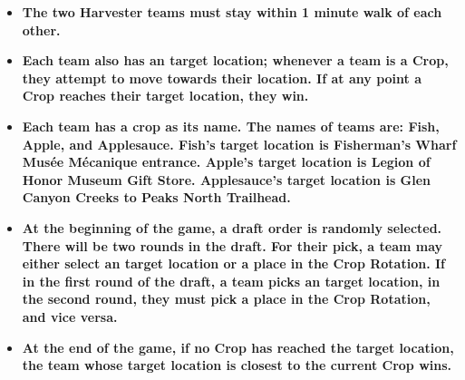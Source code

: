 \documentclass{article}
\begin{document}
\begin{itemize}
    \item \textbf{The two Harvester teams must stay within 1 minute walk of each other. }
    \item \textbf{Each team also has an target location; whenever a team is a Crop, they attempt to move towards their location. If at any point a Crop reaches their target location, they win.}
    \item \textbf{Each team has a crop as its name. The names of teams are: Fish, Apple, and Applesauce. Fish's target location is Fisherman's Wharf Musée Mécanique entrance. Apple's target location is Legion of Honor Museum Gift Store. Applesauce's target location is Glen Canyon Creeks to Peaks North Trailhead. }
    \item \textbf{At the beginning of the game, a draft order is randomly selected. There will be two rounds in the draft. For their pick, a team may either select an target location or a place in the Crop Rotation. If in the first round of the draft, a team picks an target location, in the second round, they must pick a place in the Crop Rotation, and vice versa.}
    \item \textbf{At the end of the game, if no Crop has reached the target location, the team whose target location is closest to the current Crop wins.}
\end{itemize}
\end{document}
